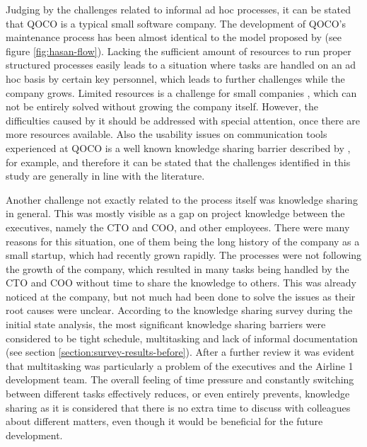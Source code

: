 Judging by the challenges related to informal ad hoc processes, it can be stated that QOCO is a typical small software company. The development of QOCO's maintenance process has been almost identical to
the model proposed by \citet{Hasan2011} (see figure \ref{fig:hasan-flow}). Lacking the sufficient amount of resources to run proper structured processes easily leads to a situation where tasks are handled
on an ad hoc basis by certain key personnel, which leads to further challenges while the company grows. Limited resources is a challenge for small companies \citep{Basri2010}, which can not be entirely solved
without growing the company itself. However, the difficulties caused by it should be addressed with special attention, once there are more resources available.
Also the usability issues on communication tools experienced at QOCO is a well known knowledge sharing barrier described by \citet{Ghobadi2016}, for
example, and therefore it can be stated that the challenges identified in this study are generally in line with the literature.

Another challenge not exactly related to the process itself was knowledge sharing in general. This was mostly visible as a gap on project knowledge between the executives, namely the CTO and COO,
and other employees. There were many reasons for this situation, one of them being the long history of the company as a small startup, which had recently grown rapidly. The processes were not following
the growth of the company, which resulted in many tasks being handled by the CTO and COO without time to share the knowledge to others. This was already noticed at the company, but not much had
been done to solve the issues as their root causes were unclear. According to the knowledge sharing survey during the initial state analysis, the most significant knowledge sharing barriers were considered to be
tight schedule, multitasking and lack of informal documentation (see section \ref{section:survey-results-before}). After a further review it was evident that multitasking was particularly a problem of the executives and the Airline 1 development team.
The overall feeling of time pressure and constantly switching between different tasks effectively reduces, or even entirely prevents, knowledge sharing as it is considered that there is no extra time
to discuss with colleagues about different matters, even though it would be beneficial for the future development.

